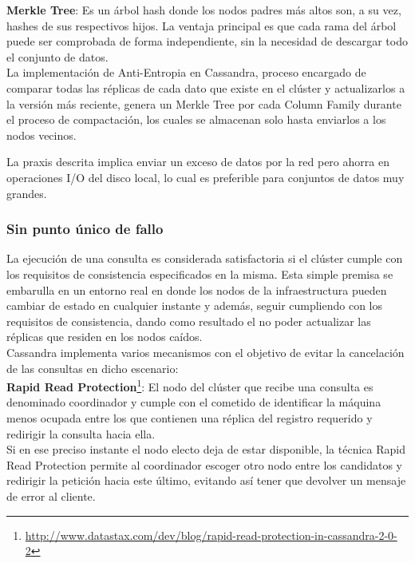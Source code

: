 \textbf{Merkle Tree}\cite{merkle1987digital}: Es un árbol hash donde los nodos padres más altos son, a su vez, hashes de sus respectivos hijos. La ventaja principal es que cada rama del árbol puede ser comprobada de forma independiente, sin la necesidad de descargar todo el conjunto de datos.\\

La implementación de Anti-Entropia\cite{golay1949notes} en Cassandra, proceso encargado de comparar todas las réplicas de cada dato que existe en el clúster y actualizarlos a la versión más reciente, genera un Merkle Tree por cada Column Family durante el proceso de compactación, los cuales se almacenan solo hasta enviarlos a los nodos vecinos. 

La praxis descrita implica enviar un exceso de datos por la red pero ahorra en operaciones I/O del disco local, lo cual es preferible para conjuntos de datos muy grandes.\\

\subsubsection{Sin punto único de fallo}

La ejecución de una consulta es considerada satisfactoria si el clúster cumple con los requisitos de consistencia especificados en la misma. Esta simple premisa se embarulla en un entorno real en donde los nodos de la infraestructura pueden cambiar de estado en cualquier instante y además, seguir cumpliendo con los requisitos de consistencia, dando como resultado el no poder actualizar las réplicas que residen en los nodos caídos.\\ 

Cassandra implementa varios mecanismos con el objetivo de evitar la cancelación de las consultas en dicho escenario:\\

\textbf{Rapid Read Protection}\footnote{\url{http://www.datastax.com/dev/blog/rapid-read-protection-in-cassandra-2-0-2}}: 
El nodo del clúster que recibe una consulta es denominado coordinador y cumple con el cometido de identificar la máquina menos ocupada entre los que contienen una réplica del registro requerido y redirigir la consulta hacia ella.\\

Si en ese preciso instante el nodo electo deja de estar disponible, la técnica Rapid Read Protection permite al coordinador escoger otro nodo entre los candidatos y redirigir la petición hacia este último, evitando así tener que devolver un mensaje de error al cliente.\\

